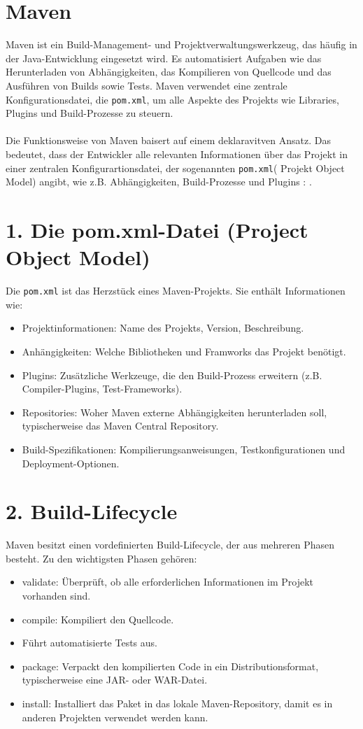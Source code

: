\documentclass[a4paper,12pt]{scrreprt}
\begin{document}
\section{Maven}
Maven ist ein Build-Management- und Projektverwaltungswerkzeug, das häufig in der Java-Entwicklung eingesetzt wird. Es automatisiert Aufgaben wie das Herunterladen von Abhängigkeiten, das Kompilieren von Quellcode und das Ausführen von Builds sowie Tests. Maven verwendet eine zentrale Konfigurationsdatei, die \texttt{pom.xml}, um alle Aspekte des Projekts wie Libraries, Plugins und Build-Prozesse zu steuern.\\ \\
Die Funktionsweise von Maven baisert auf einem deklaravitven Ansatz. Das bedeutet, dass der Entwickler alle relevanten Informationen über das Projekt in einer zentralen Konfigurartionsdatei, der sogenannten \texttt{pom.xml}( Projekt Object Model) angibt, wie z.B. Abhängigkeiten, Build-Prozesse und Plugins : \cite{deinhard24}.
\section*{\small \textbf{1. Die pom.xml-Datei (Project Object Model)}}
Die \texttt{pom.xml} ist das Herzstück eines Maven-Projekts. Sie enthält Informationen wie:
\begin{itemize}
\item Projektinformationen: Name des Projekts, Version, Beschreibung.
\item Anhängigkeiten: Welche Bibliotheken und Framworks das Projekt benötigt.
\item Plugins: Zusätzliche Werkzeuge, die den Build-Prozess erweitern (z.B. Compiler-Plugins, Test-Frameworks).
\item Repositories: Woher Maven externe Abhängigkeiten herunterladen soll, typischerweise das Maven Central Repository.
\item Build-Spezifikationen: Kompilierungsanweisungen, Testkonfigurationen und Deployment-Optionen.
\end{itemize}
\section*{\small \textbf{2. Build-Lifecycle}}
Maven besitzt einen vordefinierten Build-Lifecycle, der aus mehreren Phasen besteht. Zu den wichtigsten Phasen gehören:
\begin{itemize}
\item validate: Überprüft, ob alle erforderlichen Informationen im Projekt vorhanden sind.
\item compile: Kompiliert den Quellcode.
\item Führt automatisierte Tests aus.
\item package: Verpackt den kompilierten Code in ein Distributionsformat, typischerweise eine JAR- oder WAR-Datei.
\item install: Installiert das Paket in das lokale Maven-Repository, damit es in anderen Projekten verwendet werden kann.
\end{itemize}
\end{document}
